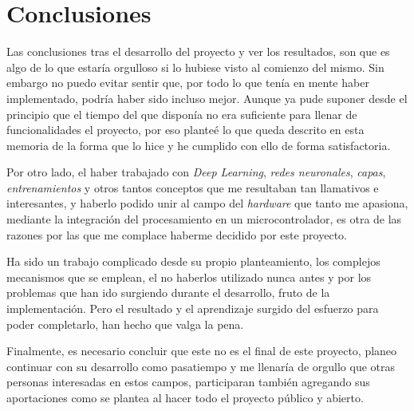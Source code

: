 \chapter{Conclusiones}
Las conclusiones tras el desarrollo del proyecto y ver los resultados, son que
es algo de lo que estaría orgulloso si lo hubiese visto al comienzo del mismo.
Sin embargo no puedo evitar sentir que, por todo lo que tenía en mente
haber implementado, podría haber sido incluso mejor. Aunque ya pude suponer
desde el principio que el tiempo del que disponía no era suficiente para llenar
de funcionalidades el proyecto, por eso planteé lo que queda descrito en esta
memoria de la forma que lo hice y he cumplido con ello de forma satisfactoria.

Por otro lado, el haber trabajado con \textit{Deep Learning}, \textit{redes neuronales},
\textit{capas}, \textit{entrenamientos} y otros tantos conceptos que me resultaban tan llamativos
e interesantes, y haberlo podido unir al campo del \textit{hardware} que tanto
me apasiona, mediante la integración del procesamiento en un microcontrolador,
es otra de las razones por las que me complace haberme decidido por este proyecto.

Ha sido un trabajo complicado desde su propio planteamiento, los complejos mecanismos
que se emplean, el no haberlos utilizado nunca antes y por los problemas
que han ido surgiendo durante el desarrollo, fruto de la implementación.
Pero el resultado y el aprendizaje surgido del esfuerzo para poder completarlo,
han hecho que valga la pena.

Finalmente, es necesario concluir que este no es el final de este proyecto,
planeo continuar con su desarrollo como pasatiempo y me llenaría de orgullo
que otras personas interesadas en estos campos, participaran también
agregando sus aportaciones como se plantea al hacer todo el proyecto
público y abierto.